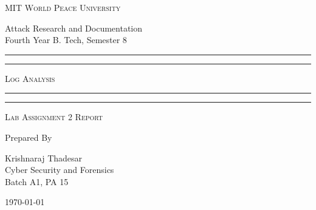 \documentclass[11pt]{article}
\begin{document}
\begin{titlepage}
	\centering


	\huge\textsc{
		MIT World Peace University
	}\\

	\vspace{0.75\baselineskip} %

	\LARGE{
		Attack Research and Documentation\\
		Fourth Year B. Tech, Semester 8
	}

	\vfill %


	\rule{\textwidth}{1.6pt}\vspace*{-\baselineskip}\vspace*{2pt}
	\rule{\textwidth}{0.6pt}
	\vspace{0.75\baselineskip} %

	\huge{\textsc{
        Log Analysis
        }} \\

	\vspace{0.5\baselineskip} %
	\rule{\textwidth}{0.6pt}\vspace*{-\baselineskip}\vspace*{2.8pt}
	\rule{\textwidth}{1.6pt}

	\vspace{1\baselineskip} %


	\LARGE\textsc{
		Lab Assignment 2 Report
	} %
	\vfill


	Prepared By \vspace{0.5\baselineskip} %

	\Large{
		Krishnaraj Thadesar \\
		Cyber Security and Forensics\\
        Batch A1, PA 15
	}

	\vspace{0.5\baselineskip} %
	\today

\end{titlepage}
\end{document}
